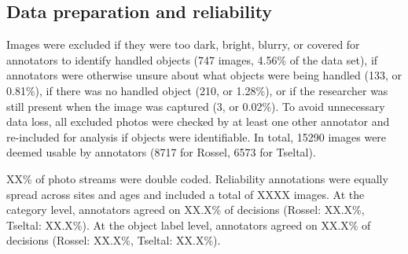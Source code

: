 \documentclass[10pt, letterpaper]{article}
\begin{document}
\hypertarget{data-preparation-and-reliability}{%
\subsection{Data preparation and
reliability}\label{data-preparation-and-reliability}}

Images were excluded if they were too dark, bright, blurry, or covered
for annotators to identify handled objects (747 images, 4.56\% of the
data set), if annotators were otherwise unsure about what objects were
being handled (133, or 0.81\%), if there was no handled object (210, or
1.28\%), or if the researcher was still present when the image was
captured (3, or 0.02\%). To avoid unnecessary data loss, all excluded
photos were checked by at least one other annotator and re-included for
analysis if objects were identifiable. In total, 15290 images were
deemed usable by annotators (8717 for Rossel, 6573 for Tseltal).

XX\% of photo streams were double coded. Reliability annotations were
equally spread across sites and ages and included a total of XXXX
images. At the category level, annotators agreed on XX.X\% of decisions
(Rossel: XX.X\%, Tseltal: XX.X\%). At the object label level, annotators
agreed on XX.X\% of decisions (Rossel: XX.X\%, Tseltal: XX.X\%).

\begin{table}[!ht]

\caption{\label{tab:top-objects}Unique object counts (N) and objects handled by the most children for each category across sites.}
\centering
{}
\end{table}
\end{document}
